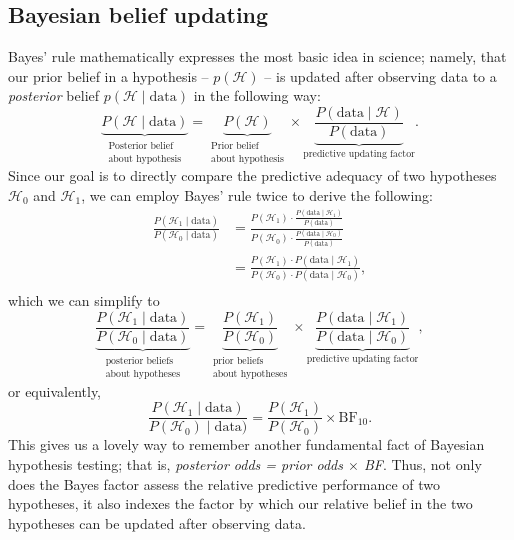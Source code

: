 \documentclass[english,,doc,floatsintext]{apa6}
\begin{document}
\hypertarget{bayesian-belief-updating}{%
\subsection{Bayesian belief updating}\label{bayesian-belief-updating}}

Bayes' rule mathematically expresses the most basic idea in science; namely, that our prior belief in a hypothesis -- \(p(\mathcal{H})\) -- is updated after observing data to a \emph{posterior} belief \(p(\mathcal{H}\mid \text{data})\) in the following way:
\[
\underbrace{P(\mathcal{H}\mid \text{data})}_{\substack{\text{Posterior belief}\\ \text{about hypothesis}}} = \underbrace{P(\mathcal{H})}_{\substack{\text{Prior belief}\\ \text{about hypothesis}}} \times \underbrace{\frac{P(\text{data}\mid \mathcal{H})}{P(\text{data})}}_{\text{predictive updating factor}}.
\]
Since our goal is to directly compare the predictive adequacy of two hypotheses \(\mathcal{H}_0\) and \(\mathcal{H}_1\), we can employ Bayes' rule twice to derive the following:
\begin{align*}
  \frac{P(\mathcal{H}_1\mid \text{data})}{P(\mathcal{H}_0\mid \text{data})}
  & = \frac{P(\mathcal{H}_1) \cdot \frac{P(\text{data}\mid \mathcal{H}_1)}{P(\text{data})}}{P(\mathcal{H}_0) \cdot  \frac{P(\text{data}\mid \mathcal{H}_0)}{P(\text{data})}} \\ 
  & = \frac{P(\mathcal{H}_1)\cdot P(\text{data}\mid \mathcal{H}_1)}{P(\mathcal{H}_0)\cdot P(\text{data}\mid \mathcal{H}_0)},\\
\end{align*}
which we can simplify to
\[
\underbrace{\frac{P(\mathcal{H}_1\mid \text{data})}{P(\mathcal{H}_0\mid \text{data})}}_{\substack{\text{posterior beliefs}\\ \text{about hypotheses}}} = \underbrace{\frac{P(\mathcal{H}_1)}{P(\mathcal{H}_0)}}_{\substack{\text{prior beliefs}\\ \text{about hypotheses}}} \times \underbrace{\frac{P(\text{data}\mid \mathcal{H}_1)}{P(\text{data}\mid \mathcal{H}_0)}}_{\text{predictive updating factor}}, 
\]
or equivalently,
\[
\frac{P(\mathcal{H}_1\mid \text{data})}{P(\mathcal{H}_0) \mid \text{data})} = \frac{P(\mathcal{H}_1)}{P(\mathcal{H}_0)} \times \text{BF}_{10}. 
\]
This gives us a lovely way to remember another fundamental fact of Bayesian hypothesis testing; that is, \emph{posterior odds = prior odds \(\times\) BF}. Thus, not only does the Bayes factor assess the relative predictive performance of two hypotheses, it also indexes the factor by which our relative belief in the two hypotheses can be updated after observing data.
\end{document}
